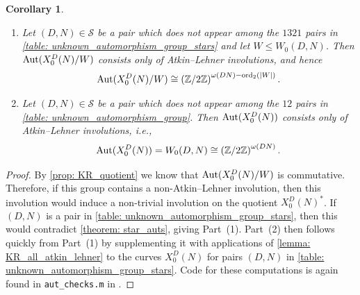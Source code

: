 \documentclass[11pt,reqno]{amsart}
\newcommand{\Z}{\mathbb{Z}}
\newcommand{\Aut}{{\rm Aut}}
\newtheorem{corollary}[theorem]{Corollary}
\theoremstyle{definition}
\newcommand{\Pietro}[1]{{\color{orange}{??Pietro: #1}}} %
\newcommand{\freddy}[1]{{\color{purple}{$\spadesuit$ Freddy: #1}}}
\begin{document}
\begin{corollary}\label{corollary: all_atkin_lehner}
\phantom{a}
\begin{enumerate}
    \item Let $(D,N) \in \mathcal{S}$ be a pair which does not appear among the $1321$ pairs in \cref{table: unknown_automorphism_group_stars} and let $W \leq W_0(D,N)$. Then $\Aut(X_0^D(N)/W)$ consists only of Atkin--Lehner involutions, and hence
\[ \Aut(X_0^D(N)/W) \cong \left(\Z/2\Z\right)^{\omega(DN) - \textnormal{ord}_2\left(|W|\right)}. \]
\item Let $(D,N) \in \mathcal{S}$ be a pair which does not appear among the $12$ pairs in \cref{table: unknown_automorphism_group}. Then $\Aut(X_0^D(N))$ consists only of Atkin--Lehner involutions, i.e., 
\[ \Aut(X_0^D(N)) = W_0(D,N) \cong \left(\Z/2\Z\right)^{\omega(DN)}. \]
\end{enumerate}
\end{corollary}%
\begin{proof}
By \cref{prop: KR_quotient} we know that $\Aut(X_0^D(N)/W)$ is commutative. Therefore, if this group contains a non-Atkin--Lehner involution, then this involution would induce a non-trivial involution on the quotient $X_0^D(N)^*$. If $(D,N)$ is a pair in \cref{table: unknown_automorphism_group_stars}, then this would contradict \cref{theorem: star_auts}, giving Part~(1). %
Part~(2) then follows quickly from Part~(1) by supplementing it with applications of \cref{lemma: KR_all_atkin_lehner} to the curves $X_0^D(N)$ for pairs $(D,N)$ in \cref{table: unknown_automorphism_group_stars}. Code for these computations is again found in \texttt{aut{\_}checks.m} in \cite{MPSSRep}. 
\end{proof}
\end{document}
